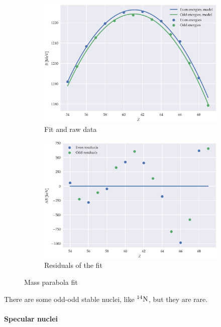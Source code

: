 \documentclass{article}
\begin{document}
\begin{figure}[H]
  \centering
  \begin{subfigure}{0.5\textwidth}
      \includegraphics[width=\textwidth]{../figures/parabolic_fits.eps}
      \caption{Fit and raw data}
  \end{subfigure}%
  \begin{subfigure}{0.5\textwidth}
      \includegraphics[width=\textwidth]{../figures/residuals.eps}
      \caption{Residuals of the fit}
  \end{subfigure}
  \caption{Mass parabola fit}
  \label{fig:mass-parabola-fit}
\end{figure}

There are some odd-odd stable nuclei, like \(^{14} \ce{N} \), but they are rare.

\paragraph{Specular nuclei}
\end{document}
